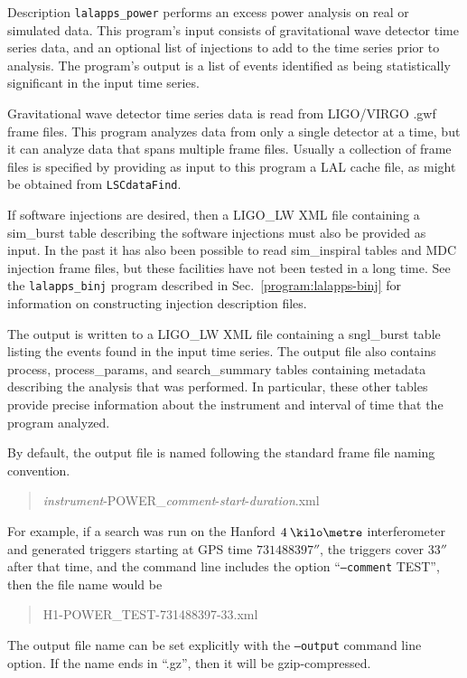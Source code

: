 \documentclass[10pt]{article}
\newcommand{\prog}[1]{\texttt{#1}}
\newcommand{\option}[1]{\texttt{#1}}
\newcommand{\parm}[1]{\textit{#1}}
\newenvironment{entry}%
{\begin{list}{}{\renewcommand{\makelabel}[1]%
{\parbox[b]{\labelwidth}{\makebox[0pt][l]{\textbf{##1}}\\}}%
\setlength{\labelwidth}{1em}%
\setlength{\labelsep}{1em}%
\setlength{\leftmargin}{2em}%
\setlength{\topsep}{\medskipamount}%
\setlength{\itemsep}{\medskipamount}%
\setlength{\parsep}{\medskipamount}%
\setlength{\listparindent}{0pt}}}
{\end{list}}
\begin{document}
\begin{entry}
\item[Description] 
\prog{lalapps\_power} performs an excess power analysis on real or
simulated data.  This program's input consists of gravitational wave
detector time series data, and an optional list of injections to add to the
time series prior to analysis.  The program's output is a list of events
identified as being statistically significant in the input time series.

Gravitational wave detector time series data is read from LIGO/VIRGO .gwf
frame files.  This program analyzes data from only a single detector at a
time, but it can analyze data that spans multiple frame files.  Usually a
collection of frame files is specified by providing as input to this
program a LAL cache file, as might be obtained from \prog{LSCdataFind}.

If software injections are desired, then a LIGO\_LW XML file containing a
sim\_burst table describing the software injections must also be provided
as input.  In the past it has also been possible to read sim\_inspiral
tables and MDC injection frame files, but these facilities have not been
tested in a long time.  See the \prog{lalapps\_binj} program described in
Sec.~\ref{program:lalapps-binj} for information on constructing injection
description files.

The output is written to a LIGO\_LW XML file containing a sngl\_burst table
listing the events found in the input time series.  The output file also
contains process, process\_params, and search\_summary tables containing
metadata describing the analysis that was performed.  In particular, these
other tables provide precise information about the instrument and interval
of time that the program analyzed.

By default, the output file is named following the standard frame file
naming convention.
\begin{quote}
\parm{instrument}-POWER\_\parm{comment}-\parm{start}-\parm{duration}.xml
\end{quote}
For example, if a search was run on the Hanford \(\unit{4}{\kilo\metre}\)
interferometer and generated triggers starting at GPS time
\(\unit{731488397}{\second}\), the triggers cover \(\unit{33}{\second}\)
after that time, and the command line includes the option
``\option{--comment} TEST'', then the file name would be 
\begin{quote}
H1-POWER\_TEST-731488397-33.xml
\end{quote}
The output file name can be set explicitly with the \option{--output}
command line option.  If the name ends in ``.gz'', then it will be
gzip-compressed.


\end{entry}
\end{document}

